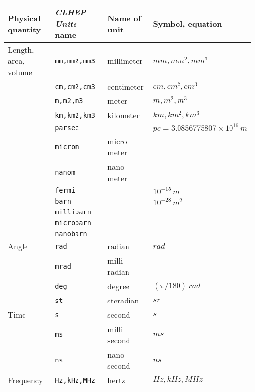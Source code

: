 \begin{table}
\centering
\begin{tabular}{|l|l|l|l|}
\hline
\bf{Physical quantity}&
\bf{{\it CLHEP Units} name}&
\bf{Name of unit}&\bf{Symbol, equation}\\
\hline
Length, area, volume&{\tt mm,mm2,mm3}    & millimeter   &$ mm,mm^2,mm^3  $\\
                   &{\tt cm,cm2,cm3}    & centimeter   &$ cm,cm^2,cm^3   $\\
                   &{\tt m,m2,m3}       & meter        &$ m,m^2,m^3      $\\ 
                   &{\tt km,km2,km3}    & kilometer    &$ km,km^2,km^3   $\\
                   &{\tt parsec}        & &$pc=3.0856775807\times 10^{16}\,m$\\
                   &{\tt microm}        & micro meter  &$                $\\
                   &{\tt nanom}         & nano meter   &$                $\\
                   &{\tt fermi}         &              &$ 10^{-15}\,m    $\\
                   &{\tt barn}          &              &$ 10^{-28}\,m^2  $\\ 
                   &{\tt millibarn}     &              &$                $\\
                   &{\tt microbarn}     &              &$                $\\
                   &{\tt nanobarn}      &              &$                $\\
Angle              &{\tt rad}           & radian       &$ rad            $\\
                   &{\tt mrad}          & milli radian &$                $\\
                   &{\tt deg}           & degree       &$ (\pi/180)\,rad $\\
                   &{\tt st}            & steradian    &$ sr             $\\
Time               &{\tt s}             & second       &$ s              $\\
                   &{\tt ms}            & milli second &$ ms             $\\
                   &{\tt ns}            & nano second  &$ ns             $\\
Frequency          &{\tt Hz,kHz,MHz}    & hertz        &$ Hz,kHz,MHz     $\\

\end{tabular}
\end{table}
